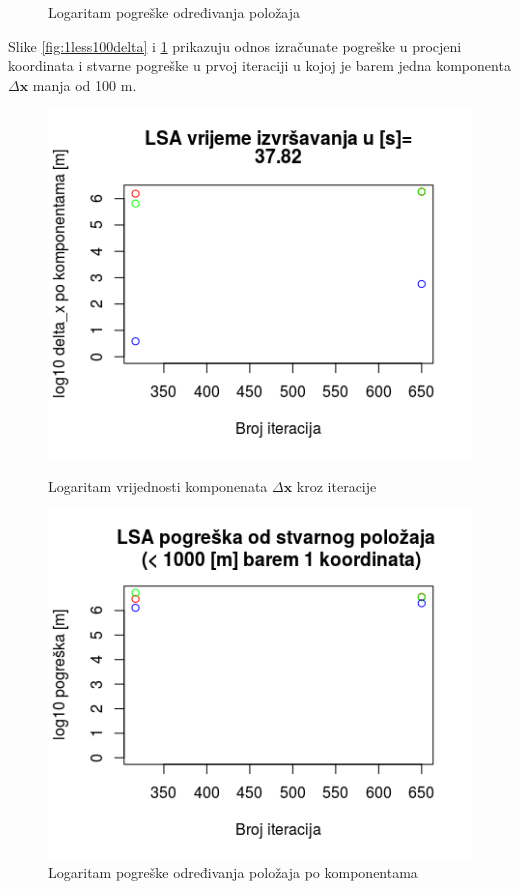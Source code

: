 \documentclass[a4paper,twoside,12pt]{memoir} %
\begin{document}
\begin{figure}[H]
\begin{minipage}{0.48\textwidth}
		\caption{Logaritam pogreške određivanja položaja}
		\label{fig:1less100real}
	\end{minipage}%
\end{figure}
Slike \ref{fig:1less100delta} i \ref{fig:1less100real} prikazuju odnos izračunate pogreške u procjeni koordinata i stvarne pogreške u prvoj iteraciji u kojoj je barem jedna komponenta $\Delta \mathbf{x}$
manja od 100 m.

\begin{figure}[H]
	\begin{minipage}{0.48\textwidth}
		\centering
		\includegraphics[width=1\textwidth]{1less1000deltab}
		\caption{Logaritam vrijednosti komponenata $\Delta \mathbf{x}$ kroz iteracije }
		\label{fig:1less1000delta}
	\end{minipage}%
	\hspace{1cm}
	\begin{minipage}{0.48\textwidth}
		\centering
		\includegraphics[width=1\textwidth]{1less1000realb}
		\caption{Logaritam pogreške određivanja položaja po komponentama}
		\label{fig:1less1000real}
	\end{minipage}%
\end{figure}
\end{document}
